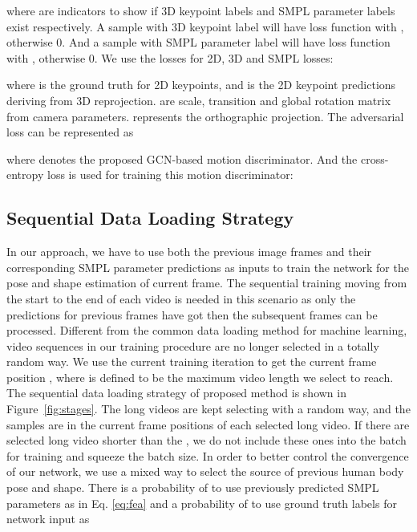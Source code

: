 \documentclass[10pt,twocolumn,letterpaper]{article}
\newcommand{\figref}[1]{Figure~\ref{fig:#1}}
\begin{document}
where  are indicators to show if 3D keypoint labels and SMPL parameter labels exist respectively. A sample with 3D keypoint label will have loss function with , otherwise 0. And a sample with SMPL parameter label will have loss function with , otherwise 0. We use the  losses for 2D, 3D and SMPL losses:



where  is the ground truth for 2D keypoints, and  is the 2D keypoint predictions deriving from 3D reprojection.  are scale, transition and global rotation matrix from camera parameters.  represents the orthographic projection. The adversarial loss can be represented as

where  denotes the proposed GCN-based motion discriminator. And the cross-entropy loss is used for training this motion discriminator: 
\begin{small}

\end{small}


\subsection{Sequential Data Loading Strategy}
In our approach, we have to use both the previous image frames and their corresponding SMPL parameter predictions as inputs to train the network for the pose and shape estimation of current frame. The sequential training moving from the start to the end of each video is needed in this scenario as only the predictions for previous frames have got then the subsequent frames can be processed. Different from the common data loading method for machine learning, video sequences in our training procedure are no longer selected in a totally random way. We use the current training iteration  to get the current frame position , where  is defined to be the maximum video length we select to reach. The sequential data loading strategy of proposed method is shown in \figref{stages}. The long videos are kept selecting with a random way, and the samples are in the current frame positions of each selected long video. If there are selected long video shorter than the , we do not include these ones into the batch for training and squeeze the batch size. In order to better control the convergence of our network, we use a mixed way to select the source of previous human body pose and shape. There is a probability of  to use previously predicted SMPL parameters as in Eq. \ref{eq:fea} and a probability of  to use ground truth labels for network input as
\end{document}
